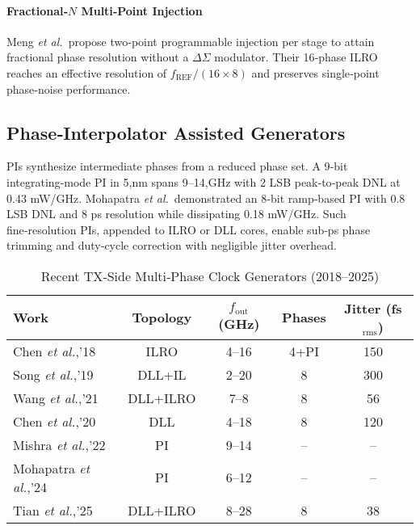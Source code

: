 \paragraph{Fractional‑$N$ Multi‑Point Injection} Meng \textit{et al.}\ propose two‑point programmable injection per stage to attain fractional phase resolution without a $\Delta\Sigma$ modulator.  Their 16‑phase ILRO reaches an effective resolution of $f_{\mathrm{REF}}/(16\times8)$ and preserves single‑point phase‑noise performance\cite{Meng2024FractionalILRO}.

\subsection{Phase‑Interpolator Assisted Generators}
PIs synthesize intermediate phases from a reduced phase set.  A 9‑bit integrating‑mode PI in 5,nm spans 9–14,GHz with 2 LSB peak‑to‑peak DNL at 0.43 mW/GHz\cite{Mishra2022ISSCC}.  Mohapatra \textit{et al.}\ demonstrated an 8‑bit ramp‑based PI with 0.8 LSB DNL and 8 ps resolution while dissipating 0.18 mW/GHz\cite{Mohapatra2024ISSCC}.  Such fine‑resolution PIs, appended to ILRO or DLL cores, enable sub‑ps phase trimming and duty‑cycle correction with negligible jitter overhead.

\begin{table}[t]
\centering
\caption{Recent TX‑Side Multi‑Phase Clock Generators (2018–2025)}
\label{tab:mp_survey}
\begin{tabular}{@{}lcccc@{}}
\toprule
Work & Topology & $f_{\text{out}}$ (GHz) & Phases & Jitter (fs$_\text{rms}$) \\
\midrule
Chen \emph{et al.},'18\cite{Chen2018ISSCC} & ILRO & 4–16 & 4+PI & 150 \\
Song \emph{et al.},'19\cite{Song2019CICC}  & DLL+IL & 2–20 & 8 & 300 \\
Wang \emph{et al.},'21\cite{Wang2021ISSCC} & DLL+ILRO & 7–8 & 8 & 56 \\
Chen \emph{et al.},'20\cite{Chen2020VLSIC} & DLL & 4–18 & 8 & 120 \\
Mishra \emph{et al.},'22\cite{Mishra2022ISSCC} & PI & 9–14 & – & – \\
Mohapatra \emph{et al.},'24\cite{Mohapatra2024ISSCC} & PI & 6–12 & – & – \\
Tian \emph{et al.},'25\cite{Tian2025ISSCC} & DLL+ILRO & 8–28 & 8 & 38 \\
\bottomrule
\end{tabular}
\end{table}

